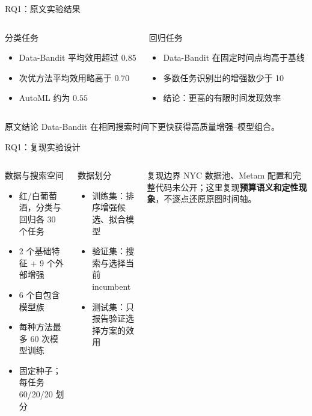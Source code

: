 \begin{frame}{RQ1：原文实验结果}
\begin{columns}[T,onlytextwidth]
\begin{exampleblock}{分类任务}
\begin{itemize}
  \item Data-Bandit 平均效用超过 $0.85$
  \item 次优方法平均效用略高于 $0.70$
  \item AutoML 约为 $0.55$
\end{itemize}
\end{exampleblock}
\begin{exampleblock}{回归任务}
\begin{itemize}
  \item Data-Bandit 在固定时间点均高于基线
  \item 多数任务识别出的增强数少于 10
  \item 结论：更高的有限时间发现效率
\end{itemize}
\end{exampleblock}
\end{columns}
\begin{alertblock}{原文结论}
Data-Bandit 在相同搜索时间下更快获得高质量增强--模型组合。
\end{alertblock}
\end{frame}

\begin{frame}{RQ1：复现实验设计}
\begin{columns}[T,onlytextwidth]
\begin{block}{数据与搜索空间}
\begin{itemize}
  \item 红/白葡萄酒，分类与回归各 30 个任务
  \item 2 个基础特征 + 9 个外部增强
  \item 6 个自包含模型族
  \item 每种方法最多 60 次模型训练
  \item 固定种子；每任务 60/20/20 划分
\end{itemize}
\end{block}
\begin{block}{数据划分}
\begin{itemize}
  \item 训练集：排序增强候选、拟合模型
  \item 验证集：搜索与选择当前 incumbent
  \item 测试集：只报告验证选择方案的效用
\end{itemize}
\end{block}
\begin{alertblock}{复现边界}
NYC 数据池、Metam 配置和完整代码未公开；这里复现\textbf{预算语义和定性现象}，不逐点还原原图时间轴。
\end{alertblock}
\end{columns}
\end{frame}

